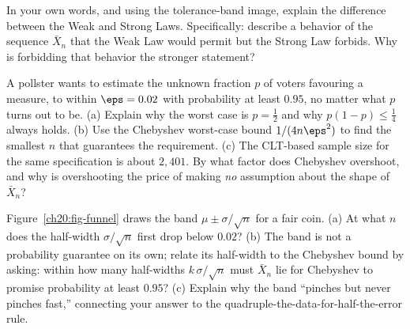 \begin{exercise}
In your own words, and using the tolerance-band image, explain the difference between the Weak and Strong Laws. Specifically: describe a behavior of the sequence $\bar X_n$ that the Weak Law would permit but the Strong Law forbids. Why is forbidding that behavior the stronger statement?
\end{exercise}

\begin{exercise}
A pollster wants to estimate the unknown fraction $p$ of voters favouring a measure, to within $\eps = 0.02$ with probability at least $0.95$, no matter what $p$ turns out to be. (a) Explain why the worst case is $p=\tfrac12$ and why $p(1-p)\le\tfrac14$ always holds. (b) Use the Chebyshev worst-case bound $1/(4n\eps^2)$ to find the smallest $n$ that guarantees the requirement. (c) The CLT-based sample size for the same specification is about $2{,}401$. By what factor does Chebyshev overshoot, and why is overshooting the price of making \emph{no} assumption about the shape of $\bar X_n$?
\end{exercise}

\begin{exercise}
Figure~\ref{ch20:fig-funnel} draws the band $\mu \pm \sigma/\sqrt n$ for a fair coin. (a) At what $n$ does the half-width $\sigma/\sqrt n$ first drop below $0.02$? (b) The band is not a probability guarantee on its own; relate its half-width to the Chebyshev bound by asking: within how many half-widths $k\,\sigma/\sqrt n$ must $\bar X_n$ lie for Chebyshev to promise probability at least $0.95$? (c) Explain why the band ``pinches but never pinches fast,'' connecting your answer to the quadruple-the-data-for-half-the-error rule.
\end{exercise}
